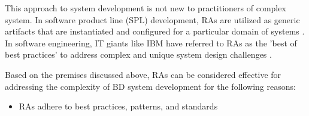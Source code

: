 \documentclass[runningheads]{llncs}
\begin{document}
This approach to system development is not new to practitioners of complex system. In software product line (SPL) development, RAs are utilized as generic artifacts that are instantiated and configured for a particular domain of systems \cite{Derras}. In software engineering, IT giants like IBM have referred to RAs as the 'best of best practices' to address complex and unique system design challenges \cite{Cloutier}.

Based on the premises discussed above, RAs can be considered effective for addressing the complexity of BD system development for the following reasons: 

\begin{itemize}
    \item RAs adhere to best practices, patterns, and standards
\end{itemize}

%
%



\end{document}
